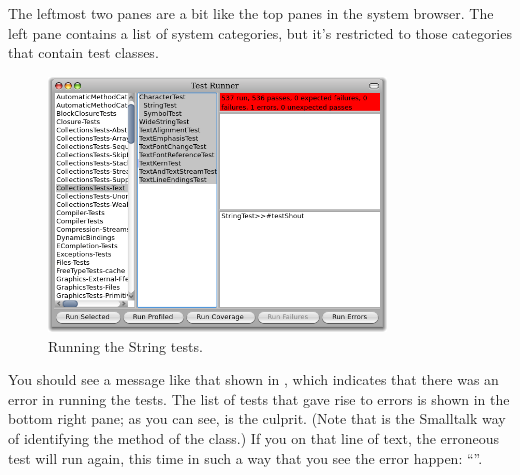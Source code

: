 \documentclass[a4paper,10pt,twoside]{book}
\begin{document}


The leftmost two panes are a bit like the top panes in the system browser.  The left pane contains a list of system categories, but it's restricted to those categories that contain test classes.


\begin{figure}[hbt]
\centerline {\includegraphics[width=0.8\textwidth]{testRunnerOnStringTest}}
\caption{Running the String tests.
\label{fig:testRunnerTestShout}}
\end{figure}

You should see a message like that shown in , which indicates that there was an error in running the tests.  The list of tests that gave rise to errors is shown in the bottom right pane; as you can see,  is the culprit.
(Note that  is the Smalltalk way of identifying the  method of the  class.)
If you \click on that line of text, the erroneous test will run again, this time in such a way that you see the error happen: ``''.
\end{document}
